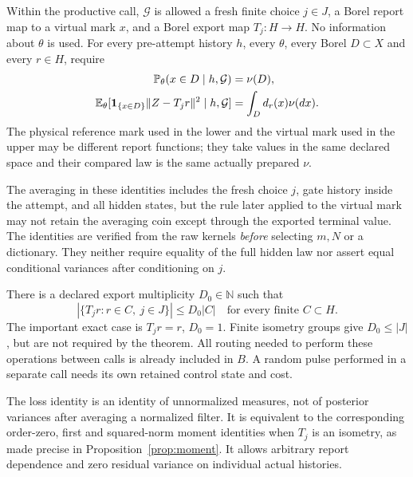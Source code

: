 Within the productive call, $\mathcal G$ is allowed a fresh finite choice $j\in J$, a Borel report map to a virtual mark $x$, and a Borel export map $T_j:H\to H$. No information about $\theta$ is used. For every pre-attempt history $h$, every $\theta$, every Borel $D\subset X$ and every $r\in H$, require
\begin{align}
 \mathbb P_\theta(x\in D\mid h,\mathcal G)&=\nu(D),\label{eq:mass-balance}\\
 \mathbb E_\theta[\mathbf1_{\{x\in D\}}\|Z-T_jr\|^2\mid h,\mathcal G]
   &=\int_D d_r(x)\nu(dx).\label{eq:loss-balance}
\end{align}
The physical reference mark used in the lower and the virtual mark used in the upper may be different report functions; they take values in the same declared space and their compared law is the same actually prepared $\nu$.

The averaging in these identities includes the fresh choice $j$, gate history inside the attempt, and all hidden states, but the rule later applied to the virtual mark may not retain the averaging coin except through the exported terminal value. The identities are verified from the raw kernels \emph{before} selecting $m,N$ or a dictionary. They neither require equality of the full hidden law nor assert equal conditional variances after conditioning on $j$.

There is a declared export multiplicity $D_0\in\mathbb N$ such that
\begin{equation}\label{eq:export}
 \left|\{T_jr:r\in C,\ j\in J\}\right|\le D_0|C|
 \quad\text{for every finite }C\subset H.
\end{equation}
The important exact case is $T_jr=r$, $D_0=1$. Finite isometry groups give $D_0\le|J|$, but are not required by the theorem. All routing needed to perform these operations between calls is already included in $B$. A random pulse performed in a separate call needs its own retained control state and cost.

The loss identity is an identity of unnormalized measures, not of posterior variances after averaging a normalized filter. It is equivalent to the corresponding order-zero, first and squared-norm moment identities when $T_j$ is an isometry, as made precise in Proposition~\ref{prop:moment}. It allows arbitrary report dependence and zero residual variance on individual actual histories.
